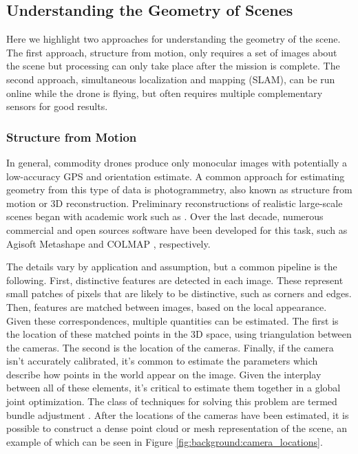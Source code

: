 \subsection{Understanding the Geometry of Scenes}
Here we highlight two approaches for understanding the geometry of the scene. The first approach, structure from motion, only requires a set of images about the scene but processing can only take place after the mission is complete. The second approach, simultaneous localization and mapping (SLAM), can be run online while the drone is flying, but often requires multiple complementary sensors for good results.
\subsubsection{Structure from Motion}
In general, commodity drones produce only monocular images with potentially a low-accuracy GPS and orientation estimate. A common approach for estimating geometry from this type of data is photogrammetry, also known as structure from motion or 3D reconstruction.  Preliminary reconstructions of realistic large-scale scenes began with academic work such as \cite{Agarwal2009}. Over the last decade, numerous commercial and open sources software have been developed for this task, such as Agisoft Metashape \cite{AgisoftMetashape} and COLMAP \cite{schoenberger2016mvs, schoenberger2016sfm}, respectively.

The details vary by application and assumption, but a common pipeline is the following. First, distinctive features are detected in each image. These represent small patches of pixels that are likely to be distinctive, such as corners and edges. Then, features are matched between images, based on the local appearance. 
Given these correspondences, multiple quantities can be estimated. The first is the location of these matched points in the 3D space, using triangulation between the cameras. The second is the location of the cameras. Finally, if the camera isn't accurately calibrated, it's common to estimate the parameters which describe how points in the world appear on the image. Given the interplay between all of these elements, it's critical to estimate them together in a global joint optimization. The class of techniques for solving this problem are termed bundle adjustment \cite{Triggs2000BundleSynthesis}. After the locations of the cameras have been estimated, it is possible to construct a dense point cloud or mesh representation of the scene, an example of which can be seen in Figure \ref{fig:background:camera_locations}.

